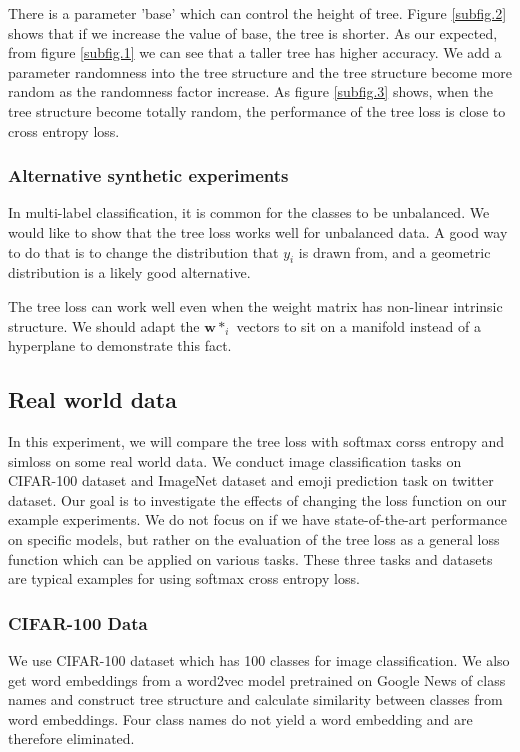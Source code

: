 \documentclass[twoside]{article}
\theoremstyle{definition}
\newcommand{\w}{\mathbf w}
\newcommand{\fixme}[1]{\noindent{\color{red}\textbf{FIXME:}  {#1}}}
\begin{document}
There is a parameter 'base' which can control the height of tree.
Figure \ref{subfig.2} shows that if we increase the value of base, the tree is shorter.
As our expected, from figure \ref{subfig.1} we can see that a taller tree has higher accuracy. 
We add a parameter randomness into the tree structure and the tree structure become more random as the randomness factor increase.
As figure \ref{subfig.3} shows, when the tree structure become totally random, the performance of the tree loss is close to cross entropy loss.


\subsubsection{Alternative synthetic experiments}

In multi-label classification, it is common for the classes to be unbalanced.
We would like to show that the tree loss works well for unbalanced data.
A good way to do that is to change the distribution that $y_i$ is drawn from,
and a geometric distribution is a likely good alternative.

The tree loss can work well even when the weight matrix has non-linear intrinsic structure.
We should adapt the $\w*_i$ vectors to sit on a manifold instead of a hyperplane to demonstrate this fact.


\subsection{Real world data}
In this experiment, we will compare the tree loss with softmax corss entropy and simloss on some real world data.
We conduct image classification tasks on CIFAR-100 dataset and ImageNet dataset and emoji prediction task on twitter dataset.
Our goal is to investigate the effects of changing the loss function on our example experiments.
We do not focus on if we have state-of-the-art performance on specific models, but rather on the evaluation of the tree loss as a general loss function which can be applied on various tasks.
These three tasks and datasets are typical examples for using softmax cross entropy loss.

\subsubsection{CIFAR-100 Data}
We use CIFAR-100 dataset which has 100 classes for image classification.
We also get word embeddings from a word2vec model pretrained on Google News \cite{Mikolov2013EfficientEO} of class names and construct tree structure and calculate similarity between classes from word embeddings.
Four class names do not yield a word embedding and are therefore eliminated.
\end{document}

